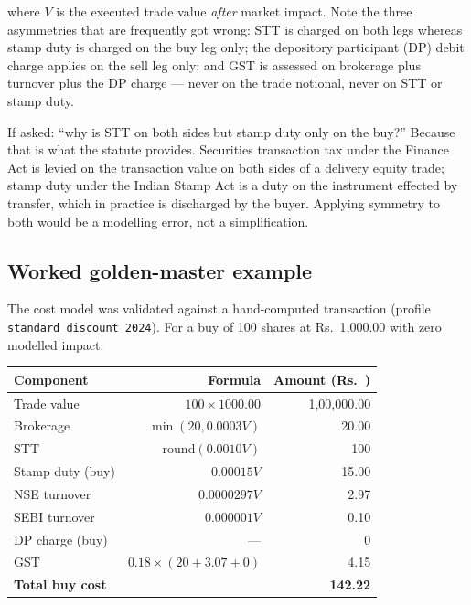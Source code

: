 \documentclass[12pt,a4paper,oneside]{report}
\newcommand{\rupee}{Rs.\ }
\begin{document}
where $V$ is the executed trade value \emph{after} market impact. Note the three
asymmetries that are frequently got wrong: STT is charged on both legs whereas
stamp duty is charged on the buy leg only; the depository participant (DP) debit
charge applies on the sell leg only; and GST is assessed on brokerage plus
turnover plus the DP charge --- never on the trade notional, never on STT or
stamp duty.

\begin{defensebox}{If asked: ``why is STT on both sides but stamp duty only on the buy?''}
Because that is what the statute provides. Securities transaction tax under the
Finance Act is levied on the transaction value on both sides of a delivery
equity trade; stamp duty under the Indian Stamp Act is a duty on the instrument
effected by transfer, which in practice is discharged by the buyer. Applying
symmetry to both would be a modelling error, not a simplification.
\end{defensebox}

\subsection{Worked golden-master example}

The cost model was validated against a hand-computed transaction (profile
\texttt{standard\_discount\_2024}). For a buy of 100 shares at
\rupee{}1{,}000.00 with zero modelled impact:

\begin{center}
\begin{tabular}{@{}p{7cm}rr@{}}
\toprule
\textbf{Component} & \textbf{Formula} & \textbf{Amount (\rupee{})} \\
\midrule
Trade value & $100 \times 1000.00$ & 1{,}00{,}000.00 \\
Brokerage & $\min(20, 0.0003V)$ & 20.00 \\
STT & round$(0.0010 V)$ & 100 \\
Stamp duty (buy) & $0.00015 V$ & 15.00 \\
NSE turnover & $0.0000297 V$ & 2.97 \\
SEBI turnover & $0.000001 V$ & 0.10 \\
DP charge (buy) & --- & 0 \\
GST & $0.18 \times (20 + 3.07 + 0)$ & 4.15 \\
\textbf{Total buy cost} & & \textbf{142.22} \\
\bottomrule
\end{tabular}
\end{center}
\end{document}

